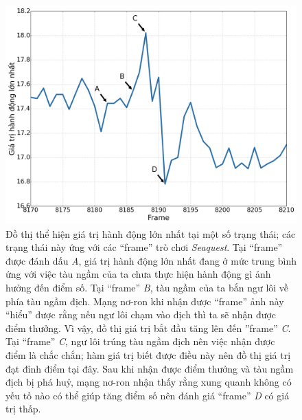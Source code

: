 	\begin{figure}
		\centering
		\includegraphics[width=\textwidth]{dqn_seaquest_frames}
		\caption[Đồ thị giá trị hành động của một số trạng thái trong một lần chơi game]{
		Đồ thị thể hiện giá trị hành động lớn nhất tại một số trạng thái; các trạng thái này ứng với các ``frame'' trò chơi \textit{Seaquest}.
		Tại ``frame'' được đánh dấu \textit{A}, giá trị hành động lớn nhất đang ở mức trung bình ứng với việc tàu ngầm của ta chưa thực hiện hành động gì ảnh hưởng đến điểm số.
		Tại ``frame'' \textit{B}, tàu ngầm của ta bắn ngư lôi về phía tàu ngầm địch.
		Mạng nơ-ron khi nhận được ``frame'' ảnh này ``hiểu'' được rằng nếu ngư lôi chạm vào địch thì ta sẽ nhận được điểm thưởng.
		Vì vậy, đồ thị giá trị bắt đầu tăng lên đến ''frame'' \textit{C}.
		Tại ``frame'' \textit{C}, ngư lôi trúng tàu ngầm địch nên việc nhận được điểm là chắc chắn; hàm giá trị biết được điều này nên đồ thị giá trị đạt đỉnh điểm tại đây.
		Sau khi nhận được điểm thưởng và tàu ngầm địch bị phá huỷ, mạng nơ-ron nhận thấy rằng xung quanh không có yếu tố nào có thể giúp tăng điểm số nên đánh giá ``frame'' \textit{D} có giá trị thấp.		
		}
		\label{fig_seaquest_frames}
	\end{figure}
